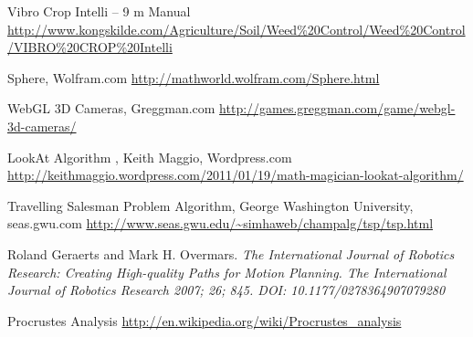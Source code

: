 


\begin{thebibliography}{99}
\begin{flushleft} Vibro Crop Intelli – 9 m Manual
\url{http://www.kongskilde.com/Agriculture/Soil/Weed%20Control/Weed%20Control/VIBRO%20CROP%20Intelli}
\end{flushleft}


  \begin{flushleft} Sphere, Wolfram.com \url{http://mathworld.wolfram.com/Sphere.html}\end{flushleft}
 \begin{flushleft} WebGL 3D Cameras, Greggman.com \url{http://games.greggman.com/game/webgl-3d-cameras/}\end{flushleft}
  \begin{flushleft} LookAt Algorithm , Keith Maggio, Wordpress.com \url{http://keithmaggio.wordpress.com/2011/01/19/math-magician-lookat-algorithm/}\end{flushleft}
    \begin{flushleft} Travelling Salesman Problem Algorithm, George Washington University, seas.gwu.com \url{http://www.seas.gwu.edu/~simhaweb/champalg/tsp/tsp.html}\end{flushleft}
 Roland Geraerts and Mark H. Overmars.
  \emph{The International Journal of Robotics Research: Creating High-quality Paths for Motion Planning. The International Journal of Robotics Research 2007; 26; 845. DOI: 10.1177/0278364907079280}
\begin{flushleft}Procrustes Analysis
\url{http://en.wikipedia.org/wiki/Procrustes_analysis}\end{flushleft}

 
 



\end{thebibliography}




